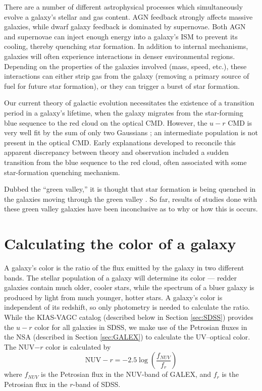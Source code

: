 There are a number of different astrophysical processes which simultaneously 
evolve a galaxy's stellar and gas content.  AGN feedback strongly affects 
massive galaxies, while dwarf galaxy feedback is dominated by supernovae.  Both 
AGN and supernovae can inject enough energy into a galaxy's ISM to prevent its 
cooling, thereby quenching star formation.  In addition to internal mechanisms, 
galaxies will often experience interactions in denser environmental regions.  
Depending on the properties of the galaxies involved (mass, speed, etc.), these 
interactions can either strip gas from the galaxy (removing a primary source of 
fuel for future star formation), or they can trigger a burst of star formation.

Our current theory of galactic evolution necessitates the existence of a 
transition period in a galaxy's lifetime, when the galaxy migrates from the 
star-forming blue sequence to the red cloud on the optical CMD.  However, the 
$u-r$ CMD is very well fit by the sum of only two Gaussians \citep{Strateva01, 
Baldry04}; an intermediate population is not present in the optical CMD.  Early 
explanations developed to reconcile this apparent discrepancy between theory and 
observation included a sudden transition from the blue sequence to the red 
cloud, often associated with some star-formation quenching mechanism.

Dubbed the ``green valley,'' it is thought that star formation 
is being quenched in the galaxies moving through the green valley 
\citep{Martin07}.  So far, results of studies done with these green valley 
galaxies have been inconclusive as to why or how this is occurs.




\section[Theory]{Calculating the color of a galaxy}

A galaxy's color is the ratio of the flux emitted by the galaxy in two different 
bands.  The stellar population of a galaxy will determine its color --- redder 
galaxies contain much older, cooler stars, while the spectrum of a bluer galaxy 
is produced by light from much younger, hotter stars.  A galaxy's color is 
independent of its redshift, so only photometry is needed to calculate the 
ratio.  While the KIAS-VAGC catalog (described below in Section \ref{sec:SDSS}) 
provides the $u-r$ color for all galaxies in SDSS, we make use of the Petrosian 
fluxes in the NSA (described in Section \ref{sec:GALEX}) to calculate the 
UV--optical color.  The NUV$-r$ color is calculated by
\begin{equation}
    \text{NUV}-r = -2.5\log \left( \frac{f_{NUV}}{f_r} \right)
\end{equation}
where $f_{NUV}$ is the Petrosian flux in the NUV-band of GALEX, and $f_r$ is the 
Petrosian flux in the $r$-band of SDSS.


